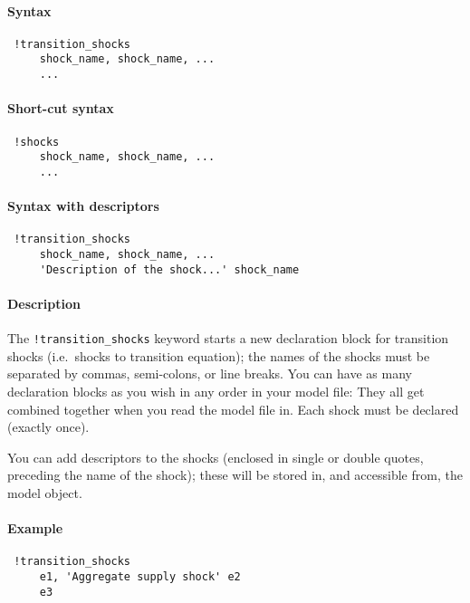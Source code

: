 


	\paragraph{Syntax}
 
 \begin{verbatim}
 !transition_shocks
     shock_name, shock_name, ...
     ...
 \end{verbatim}
 
 \paragraph{Short-cut syntax}
 
 \begin{verbatim}
 !shocks
     shock_name, shock_name, ...
     ...
 \end{verbatim}
 
 \paragraph{Syntax with descriptors}
 
 \begin{verbatim}
 !transition_shocks
     shock_name, shock_name, ...
     'Description of the shock...' shock_name
 \end{verbatim}
 
 \paragraph{Description}
 
 The \texttt{!transition\_shocks} keyword starts a new declaration block
 for transition shocks (i.e.~shocks to transition equation); the names of
 the shocks must be separated by commas, semi-colons, or line breaks. You
 can have as many declaration blocks as you wish in any order in your
 model file: They all get combined together when you read the model file
 in. Each shock must be declared (exactly once).
 
 You can add descriptors to the shocks (enclosed in single or double
 quotes, preceding the name of the shock); these will be stored in, and
 accessible from, the model object.
 
 \paragraph{Example}
 
 \begin{verbatim}
 !transition_shocks
     e1, 'Aggregate supply shock' e2
     e3
 \end{verbatim}


